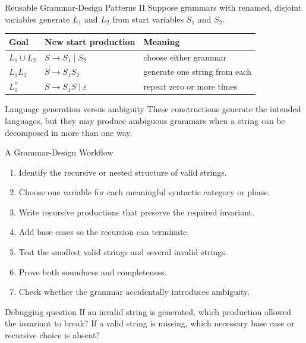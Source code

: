 \documentclass[10pt]{beamer}
\begin{document}
\begin{frame}{Reusable Grammar-Design Patterns II}
  Suppose grammars with renamed, disjoint variables generate $L_1$ and $L_2$ from start variables
  $S_1$ and $S_2$.
  \begin{center}
  \begin{tabular}{L{3.0cm}L{3.6cm}L{3.3cm}}
    \toprule
    Goal & New start production & Meaning \\
    \midrule
    $L_1\cup L_2$ & $S\to S_1\mid S_2$ & choose either grammar \\
    $L_1L_2$ & $S\to S_1S_2$ & generate one string from each \\
    $L_1^*$ & $S\to S_1S\mid\varepsilon$ & repeat zero or more times \\
    \bottomrule
  \end{tabular}
  \end{center}
  \pause
  \begin{alertblock}{Language generation versus ambiguity}
    These constructions generate the intended languages, but they may produce ambiguous grammars
    when a string can be decomposed in more than one way.
  \end{alertblock}
\end{frame}

\begin{frame}{A Grammar-Design Workflow}
  \begin{enumerate}
    \item Identify the recursive or nested structure of valid strings.
    \item Choose one variable for each meaningful syntactic category or phase.
    \item Write recursive productions that preserve the required invariant.
    \item Add base cases so the recursion can terminate.
    \item Test the smallest valid strings and several invalid strings.
    \item Prove both soundness and completeness.
    \item Check whether the grammar accidentally introduces ambiguity.
  \end{enumerate}
  \pause
  \begin{block}{Debugging question}
    If an invalid string is generated, which production allowed the invariant to break? If a valid
    string is missing, which necessary base case or recursive choice is absent?
  \end{block}
\end{frame}
\end{document}
